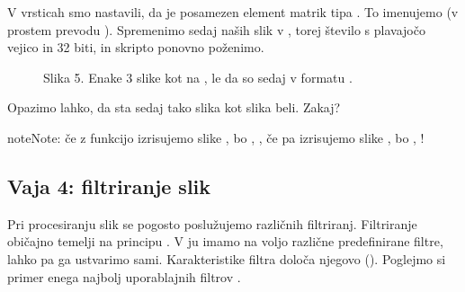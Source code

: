 \documentclass[letterpaper,10pt,english]{sphinxmanual}
\begin{document}
\sphinxAtStartPar
V vrsticah  smo nastavili, da je posamezen element matrik tipa . To imenujemo  (v prostem prevodu  ). Spremenimo sedaj  naših slik v , torej število s plavajočo vejico in 32 biti, in skripto ponovno poženimo.

\begin{figure}[htbp]
\centering
\capstart

\noindent{}
\caption{Slika 5. Enake 3 slike kot na , le da so sedaj v formatu .}\label{\detokenize{uvod_py_opencv:id6}}\end{figure}

\sphinxAtStartPar
Opazimo lahko, da sta sedaj tako slika  kot slika  beli. Zakaj?

\begin{sphinxadmonition}{note}{Note:}
\sphinxAtStartPar
{} če z  funkcijo  izrisujemo slike  , bo , , če pa izrisujemo slike  , bo , !
\end{sphinxadmonition}


\subsection{Vaja 4: filtriranje slik}
\label{\detokenize{uvod_py_opencv:vaja-4-filtriranje-slik}}
\sphinxAtStartPar
Pri procesiranju slik se pogosto poslužujemo različnih filtriranj. Filtriranje običajno temelji na principu . V \sphinxhyphen{}ju imamo na voljo različne predefinirane filtre, lahko pa ga ustvarimo sami. Karakteristike filtra določa njegovo  (). Poglejmo si primer enega najbolj uporablajnih filtrov \sphinxhyphen{} .
\end{document}
